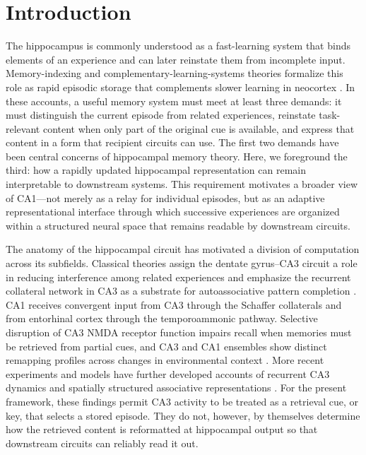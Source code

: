 \section{Introduction}

The hippocampus is commonly understood as a fast-learning system that binds elements of an experience and can later reinstate them from incomplete input.
Memory-indexing and complementary-learning-systems theories formalize this role as rapid episodic storage that complements slower learning in neocortex \citep{teyler1986,mcclelland1995}.
In these accounts, a useful memory system must meet at least three demands: it must distinguish the current episode from related experiences, reinstate task-relevant content when only part of the original cue is available, and express that content in a form that recipient circuits can use.
The first two demands have been central concerns of hippocampal memory theory.
Here, we foreground the third: how a rapidly updated hippocampal representation can remain interpretable to downstream systems.
This requirement motivates a broader view of CA1---not merely as a relay for individual episodes, but as an adaptive representational interface through which successive experiences are organized within a structured neural space that remains readable by downstream circuits.

The anatomy of the hippocampal circuit has motivated a division of computation across its subfields.
Classical theories assign the dentate gyrus--CA3 circuit a role in reducing interference among related experiences and emphasize the recurrent collateral network in CA3 as a substrate for autoassociative pattern completion \citep{marr1971,schapiro2017}.
CA1 receives convergent input from CA3 through the Schaffer collaterals and from entorhinal cortex through the temporoammonic pathway.
Selective disruption of CA3 NMDA receptor function impairs recall when memories must be retrieved from partial cues, and CA3 and CA1 ensembles show distinct remapping profiles across changes in environmental context \citep{nakazawa2002,leutgeb2004}.
More recent experiments and models have further developed accounts of recurrent CA3 dynamics and spatially structured associative representations \citep{li2024,chandra2025}.
For the present framework, these findings permit CA3 activity to be treated as a retrieval cue, or key, that selects a stored episode.
They do not, however, by themselves determine how the retrieved content is reformatted at hippocampal output so that downstream circuits can reliably read it out.

